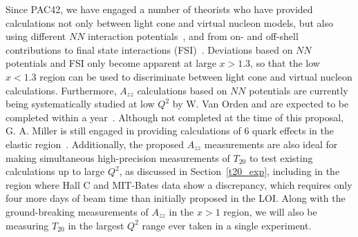 Since PAC42, we have engaged a number of theorists who have provided calculations not only between light cone and virtual nucleon models, but also using different $NN$ interaction potentials~\cite{Sargsian:2014fla}, and from on- and off-shell contributions to final state interactions (FSI)~\cite{cosyn-convo}. Deviations based on $NN$ potentials and FSI only become apparent at large $x>1.3$, so that the low $x<1.3$ region can be used to discriminate between light cone and virtual nucleon calculations. Furthermore, $A_{zz}$ calculations based on $NN$ potentials are currently being systematically studied at low $Q^2$ by W. Van Orden and are expected to be completed within a year~\cite{vanorden-convo}. Although not completed at the time of this proposal, G. A. Miller is still engaged in providing calculations of 6 quark effects in the elastic region~\cite{miller-convo}. Additionally, the proposed $A_{zz}$ measurements are also ideal for making simultaneous high-precision measurements of $T_{20}$ to test existing calculations up to large $Q^2$, as discussed in Section~\ref{t20_exp}, including in the region where Hall C and MIT-Bates data show a discrepancy, which requires only four more days of beam time than initially proposed in the LOI. Along with the ground-breaking measurements of $A_{zz}$ in the $x>1$ region, we will also be measuring $T_{20}$ in the largest $Q^2$ range ever taken in a single experiment.





